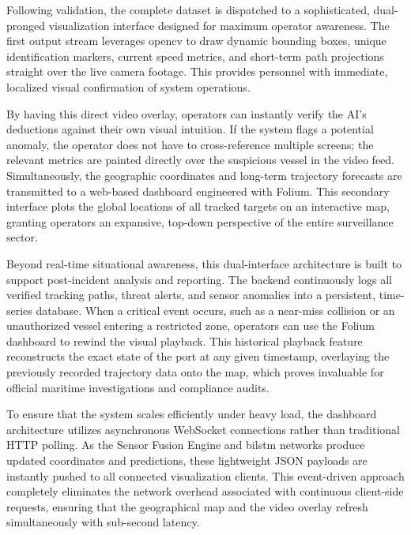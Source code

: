 Following validation, the complete dataset is dispatched to a sophisticated, dual-pronged visualization interface designed for maximum operator awareness. The first output stream leverages \gls{opencv} to draw dynamic bounding boxes, unique identification markers, current speed metrics, and short-term path projections straight over the live camera footage. This provides personnel with immediate, localized visual confirmation of system operations. 

By having this direct video overlay, operators can instantly verify the AI's deductions against their own visual intuition. If the system flags a potential anomaly, the operator does not have to cross-reference multiple screens; the relevant metrics are painted directly over the suspicious vessel in the video feed. Simultaneously, the geographic coordinates and long-term trajectory forecasts are transmitted to a web-based dashboard engineered with Folium. This secondary interface plots the global locations of all tracked targets on an interactive map, granting operators an expansive, top-down perspective of the entire surveillance sector.

Beyond real-time situational awareness, this dual-interface architecture is built to support post-incident analysis and reporting. The backend continuously logs all verified tracking paths, threat alerts, and sensor anomalies into a persistent, time-series database. When a critical event occurs, such as a near-miss collision or an unauthorized vessel entering a restricted zone, operators can use the Folium dashboard to rewind the visual playback. This historical playback feature reconstructs the exact state of the port at any given timestamp, overlaying the previously recorded trajectory data onto the map, which proves invaluable for official maritime investigations and compliance audits.

To ensure that the system scales efficiently under heavy load, the dashboard architecture utilizes asynchronous WebSocket connections rather than traditional HTTP polling. As the Sensor Fusion Engine and \gls{bilstm} networks produce updated coordinates and predictions, these lightweight JSON payloads are instantly pushed to all connected visualization clients. This event-driven approach completely eliminates the network overhead associated with continuous client-side requests, ensuring that the geographical map and the video overlay refresh simultaneously with sub-second latency.

